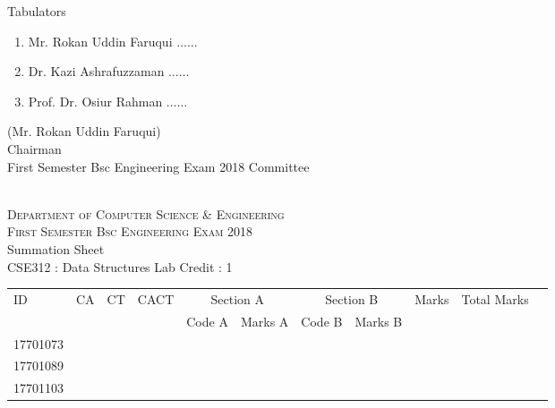\documentclass[12pt]{article}
\begin{document}
            \begin{table}[hb]
            	\centering
            \begin{minipage}[b]{0.5\linewidth} %
            {\centering Tabulators }
            \begin{enumerate}
                \item Mr. Rokan Uddin Faruqui \hspace*{1ex} $\ldots \ldots  $  
                \item Dr. Kazi Ashrafuzzaman \hspace*{1ex} $\ldots \ldots  $  
                \item Prof. Dr. Osiur Rahman \hspace*{1ex} $\ldots \ldots $  
            \end{enumerate} 

            \end{minipage}
            \hspace*{1.2cm}
            \begin{minipage}[b]{0.4\linewidth} \centering
            (Mr. Rokan Uddin Faruqui) \\
            Chairman  \hspace*{1ex} \\
           First Semester Bsc Engineering Exam 2018 Committee
            \end{minipage}
            \end{table}
            \clearpage
    \centering
    \begin{minipage}[m]{.8\textwidth} \centering 
	\smallskip
	\\
	\textsc{Department of Computer Science \& Engineering}\\
	\textsc{ First Semester Bsc Engineering Exam 2018}\\
    {\large {\sc Summation Sheet}}\\  
     {\centering CSE312 : Data Structures Lab     Credit : 1 } \\
    \end{minipage} 
    \begin{center} 
	\renewcommand{\arraystretch}{1.08}
	\begin{small}
    \begin{tabular}{|l|c|c|c|c|c|c|c|c|c|c|} \hline
	\multirow{2}{*}{ID} & 	\multirow{2}{*}{CA}  & 	\multirow{2}{*}{CT}  & 	\multirow{2}{*}{CACT}  & \multicolumn{2 }{c|}{Section A}& \multicolumn{2 }{c|}{Section B} & 	\multirow{2}{*}{Marks}  & 	\multirow{2}{*}{Total Marks}  \\ 
	&  &  &  & Code A & Marks A & Code B & Marks B&  &  \\ \hline
17701073 &  &  &  &  &  &  &  &  & \\ \hline 
17701089 &  &  &  &  &  &  &  &  & \\ \hline 
17701103 &  &  &  &  &  &  &  &  & \\ \hline 
        \end{tabular}
            \end{small}
            \end{center}
  \centering
            
\end{document}
